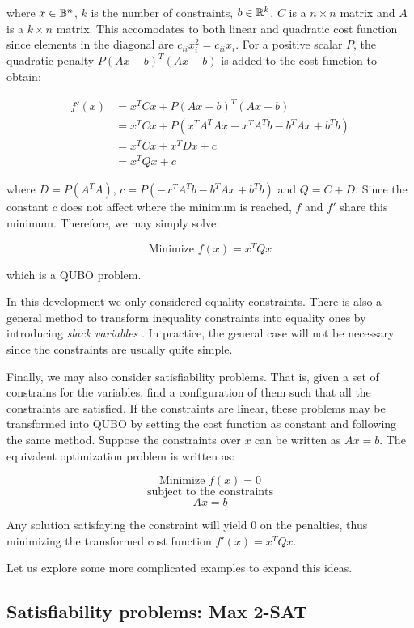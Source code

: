 where $x \in \mathbb{B}^n$, $k$ is the number of constraints, $b \in \mathbb{R}^k$, $C$ is a $n \times n$ matrix and $A$ is a $k \times n$ matrix. This accomodates to both linear and quadratic cost function since elements in the diagonal are $c_{ii} x_i^2 = c_{ii} x_i$. For a positive scalar $P$, the quadratic penalty $P (Ax - b)^T (Ax - b)$ is added to the cost function to obtain:

\begin{equation*}
	\begin{split}
		f'(x)	& = x^T C x + P (Ax - b)^T (Ax - b) \\
		& = x^T C x + P (x^TA^TAx - x^TA^Tb - b^TAx + b^Tb) \\
		& = x^T C x + x^T D x + c \\
		& = x^T Q x + c 
	\end{split}
\end{equation*}

where $D = P(A^TA)$, $c = P(- x^TA^Tb - b^TAx + b^Tb)$ and $Q = C + D$. Since the constant $c$ does not affect where the minimum is reached, $f$ and $f'$ share this minimum. Therefore, we may simply solve:

$$ \text{Minimize } f(x) = x^T Q x $$

which is a QUBO problem.

In this development we only considered equality constraints. There is also a general method to transform inequality constraints into equality ones by introducing \emph{slack variables} \cite{Hull2003}. In practice, the general case will not be necessary since the constraints are usually quite simple.

Finally, we may also consider satisfiability problems. That is, given a set of constrains for the variables, find a configuration of them such that all the constraints are satisfied. If the constraints are linear, these problems may be transformed into QUBO by setting the cost function as constant and following the same method. Suppose the constraints over $x$ can be written as $Ax = b$. The equivalent optimization problem is written as:

$$ \text{Minimize } f(x) = 0 $$
$$ \text{subject to the constraints} $$
$$ Ax = b $$

Any solution satisfaying the constraint will yield $0$ on the penalties, thus minimizing the transformed cost function $f'(x) = x^T Q x$. 

Let us explore some more complicated examples to expand this ideas.


\subsection{Satisfiability problems: Max 2-SAT}


